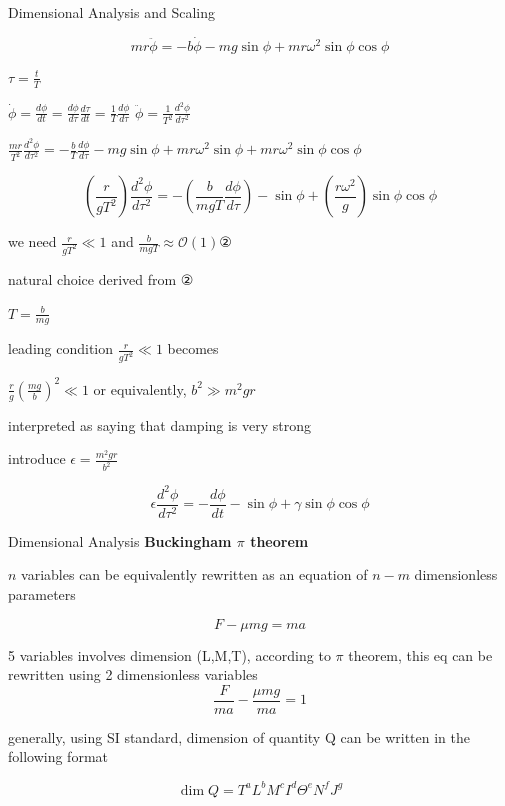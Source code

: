 \documentclass[9pt,aspectratio=43,mathserif,table]{beamer}
\begin{document}
\begin{frame}{Dimensional Analysis and Scaling}

    $$m r \ddot\phi = - b \dot \phi - mg \sin \phi + m r \omega ^2 \sin\phi\cos\phi$$

    $\tau = \frac{ t}{T}$

    $\dot \phi = \frac{ d\phi}{dt} = \frac{ d\phi}{d\tau}\frac{ d\tau}{dt} = \frac{ 1}{T} \frac{ d\phi}{d\tau}$
    \quad\quad $\ddot \phi =  \frac{ 1}{T^2} \frac{ d^2\phi}{d\tau^2}$

    $\frac{ mr}{T^2} \frac{ d^2\phi}{d\tau^2} = - \frac{ b}{T}\frac{ d\phi}{d\tau}  - mg\sin\phi + mr\omega ^2 \sin\phi + mr\omega ^2\sin\phi\cos\phi$

    $$(\frac{ r}{gT^2})\frac{ d^2\phi}{d\tau^2} = - (\frac{ b}{mgT}\frac{ d\phi}{d\tau}) - \sin\phi+(\frac{ r\omega ^2}{g})\sin\phi\cos\phi$$

    we need $\frac{ r}{gT^2} \ll 1$  and $\frac{ b}{mgT}\approx \mathcal{O}(1)$②

    natural choice derived from ②

    $T = \frac{ b}{mg}$

    leading condition $\frac{ r}{ gT^2}\ll 1$ becomes

    $\frac{ r}{g} (\frac{ mg}{b})^2 \ll 1$
    or equivalently,
    $b^2 \gg m^2gr$

    interpreted as saying that damping is very strong


    introduce $\epsilon = \frac{ m^2 g r}{b^2}$

    $$\epsilon \frac{ d^2\phi}{d\tau^2} = - \frac{ d\phi}{dt} - \sin\phi + \gamma\sin\phi\cos\phi$$

\end{frame}
\begin{frame}{Dimensional Analysis}
\textbf{Buckingham $\pi$ theorem}
 
 $n$ variables can be equivalently rewritten as an equation of $n - m$ dimensionless parameters

 $$F - \mu mg = m a$$

 5 variables involves dimension (L,M,T), according to $\pi$ theorem, this eq can be rewritten using 2 dimensionless variables 
 $$\frac{ F}{ma} - \frac{ \mu mg}{ma} = 1$$

 generally, using SI standard, dimension of quantity Q can be written in the following format

 $$\dim Q = T^{a}L^{b}M^cI^d\Theta^eN^fJ^g$$

\end{frame}
\end{document}
